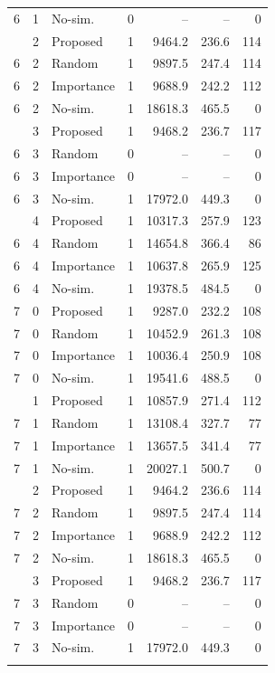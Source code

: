 \begin{table}[t]
\begin{tabular}{cc l c r r r}
6 & 1 & No-sim. & 0 & -- & -- & 0 \\
\addlinespace[1pt]
6 & 2 & Proposed & 1 & 9464.2 & 236.6 & 114 \\
6 & 2 & Random & 1 & 9897.5 & 247.4 & 114 \\
6 & 2 & Importance & 1 & 9688.9 & 242.2 & 112 \\
6 & 2 & No-sim. & 1 & 18618.3 & 465.5 & 0 \\
\addlinespace[1pt]
6 & 3 & Proposed & 1 & 9468.2 & 236.7 & 117 \\
6 & 3 & Random & 0 & -- & -- & 0 \\
6 & 3 & Importance & 0 & -- & -- & 0 \\
6 & 3 & No-sim. & 1 & 17972.0 & 449.3 & 0 \\
\addlinespace[1pt]
6 & 4 & Proposed & 1 & 10317.3 & 257.9 & 123 \\
6 & 4 & Random & 1 & 14654.8 & 366.4 & 86 \\
6 & 4 & Importance & 1 & 10637.8 & 265.9 & 125 \\
6 & 4 & No-sim. & 1 & 19378.5 & 484.5 & 0 \\
\midrule
7 & 0 & Proposed & 1 & 9287.0 & 232.2 & 108 \\
7 & 0 & Random & 1 & 10452.9 & 261.3 & 108 \\
7 & 0 & Importance & 1 & 10036.4 & 250.9 & 108 \\
7 & 0 & No-sim. & 1 & 19541.6 & 488.5 & 0 \\
\addlinespace[1pt]
7 & 1 & Proposed & 1 & 10857.9 & 271.4 & 112 \\
7 & 1 & Random & 1 & 13108.4 & 327.7 & 77 \\
7 & 1 & Importance & 1 & 13657.5 & 341.4 & 77 \\
7 & 1 & No-sim. & 1 & 20027.1 & 500.7 & 0 \\
\addlinespace[1pt]
7 & 2 & Proposed & 1 & 9464.2 & 236.6 & 114 \\
7 & 2 & Random & 1 & 9897.5 & 247.4 & 114 \\
7 & 2 & Importance & 1 & 9688.9 & 242.2 & 112 \\
7 & 2 & No-sim. & 1 & 18618.3 & 465.5 & 0 \\
\addlinespace[1pt]
7 & 3 & Proposed & 1 & 9468.2 & 236.7 & 117 \\
7 & 3 & Random & 0 & -- & -- & 0 \\
7 & 3 & Importance & 0 & -- & -- & 0 \\
7 & 3 & No-sim. & 1 & 17972.0 & 449.3 & 0 \\
\addlinespace[1pt]

\end{tabular}
\end{table}
